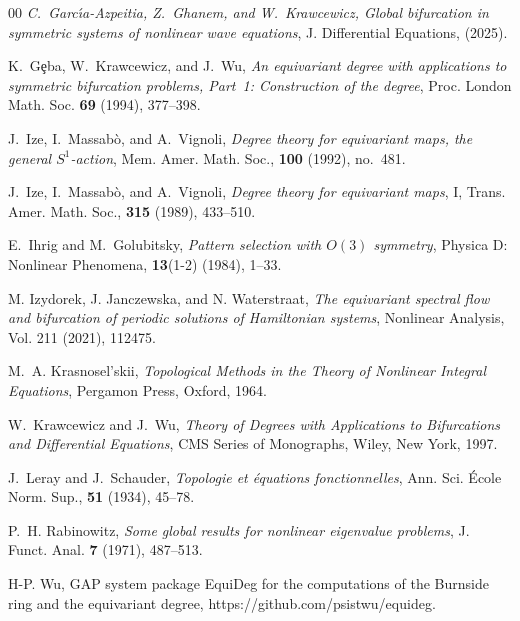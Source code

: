 \documentclass[twoside,11pt]{article}
\begin{document}
\begin{thebibliography}{00}
\emph{C.~Garc\'{\i}a-Azpeitia, Z.~Ghanem, and W.~Krawcewicz, Global bifurcation in symmetric systems of nonlinear wave equations},
J. Differential Equations, (2025).

K.~G\c{e}ba, W.~Krawcewicz, and J.~Wu,
\emph{An equivariant degree with applications to symmetric bifurcation problems, Part~1: Construction of the degree}, Proc. London Math. Soc. \textbf{69} (1994), 377--398.

J.~Ize, I.~Massab\`o, and A.~Vignoli,
\emph{Degree theory for equivariant maps, the general $S^1$-action}, Mem. Amer. Math. Soc., \textbf{100} (1992), no.~481.

J.~Ize, I.~Massab\`o, and A.~Vignoli,
\emph{Degree theory for equivariant maps}, I,
Trans. Amer. Math. Soc., \textbf{315} (1989), 433--510.

E.~Ihrig and M.~Golubitsky,
\emph{Pattern selection with $O(3)$ symmetry},
Physica D: Nonlinear Phenomena, \textbf{13}(1-2) (1984), 1--33.

M. Izydorek, J. Janczewska, and N. Waterstraat, \emph{The equivariant spectral flow and bifurcation of periodic solutions of Hamiltonian systems}, Nonlinear Analysis, Vol. 211 (2021), 112475.

M.~A. Krasnosel'skii,
\emph{Topological Methods in the Theory of Nonlinear Integral Equations},
Pergamon Press, Oxford, 1964.

W.~Krawcewicz and J.~Wu,
\emph{Theory of Degrees with Applications to Bifurcations and Differential Equations},
CMS Series of Monographs, Wiley, New York, 1997.

J.~Leray and J.~Schauder,
\emph{Topologie et \'equations fonctionnelles},
Ann. Sci. \'Ecole Norm. Sup., \textbf{51} (1934), 45--78.


P.~H. Rabinowitz,
\emph{Some global results for nonlinear eigenvalue problems},
J. Funct. Anal. \textbf{7} (1971), 487--513.

 H-P. Wu, GAP system package EquiDeg for the computations of the Burnside ring and the equivariant
degree, https://github.com/psistwu/equideg.
\end{thebibliography}
\end{document}

